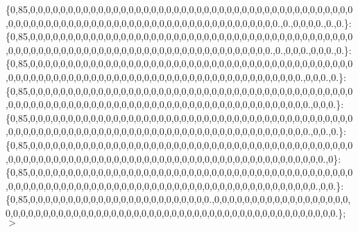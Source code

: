 \{0,85,0,0,0,0,0,0,0,0,0,0,0,0,0,0,0,0,0,0,0,0,0,0,0,0,0,0,0,0,0,0,0,0,0,0,0,0,0,0,0,0,0,0,0,0,0,0,0,0,0,0,0,0,0,0,0,0,0,0,0,0,0,0,0,0,0,0,0,0,0,0,0,0,0,0,0,0,0,0,0.,0.,0,0,0,0.,0.,0.\}\+: \{0,85,0,0,0,0,0,0,0,0,0,0,0,0,0,0,0,0,0,0,0,0,0,0,0,0,0,0,0,0,0,0,0,0,0,0,0,0,0,0,0,0,0,0,0,0,0,0,0,0,0,0,0,0,0,0,0,0,0,0,0,0,0,0,0,0,0,0,0,0,0,0,0,0,0,0,0,0,0,0.,0.,0,0,0.,0,0,0.,0.\}\+: \{0,85,0,0,0,0,0,0,0,0,0,0,0,0,0,0,0,0,0,0,0,0,0,0,0,0,0,0,0,0,0,0,0,0,0,0,0,0,0,0,0,0,0,0,0,0,0,0,0,0,0,0,0,0,0,0,0,0,0,0,0,0,0,0,0,0,0,0,0,0,0,0,0,0,0,0,0,0,0,0,0,0,0,0.,0,0,0.,0.\}\+: \{0,85,0,0,0,0,0,0,0,0,0,0,0,0,0,0,0,0,0,0,0,0,0,0,0,0,0,0,0,0,0,0,0,0,0,0,0,0,0,0,0,0,0,0,0,0,0,0,0,0,0,0,0,0,0,0,0,0,0,0,0,0,0,0,0,0,0,0,0,0,0,0,0,0,0,0,0,0,0,0,0,0,0,0,0.,0,0,0.\}\+: \{0,85,0,0,0,0,0,0,0,0,0,0,0,0,0,0,0,0,0,0,0,0,0,0,0,0,0,0,0,0,0,0,0,0,0,0,0,0,0,0,0,0,0,0,0,0,0,0,0,0,0,0,0,0,0,0,0,0,0,0,0,0,0,0,0,0,0,0,0,0,0,0,0,0,0,0,0,0,0,0,0,0,0,0,0.,0,0.,0.\}\+: \{0,85,0,0,0,0,0,0,0,0,0,0,0,0,0,0,0,0,0,0,0,0,0,0,0,0,0,0,0,0,0,0,0,0,0,0,0,0,0,0,0,0,0,0,0,0,0,0,0,0,0,0,0,0,0,0,0,0,0,0,0,0,0,0,0,0,0,0,0,0,0,0,0,0,0,0,0,0,0,0,0,0,0,0,0,0,0.,0\}\+: \{0,85,0,0,0,0,0,0,0,0,0,0,0,0,0,0,0,0,0,0,0,0,0,0,0,0,0,0,0,0,0,0,0,0,0,0,0,0,0,0,0,0,0,0,0,0,0,0,0,0,0,0,0,0,0,0,0,0,0,0,0,0,0,0,0,0,0,0,0,0,0,0,0,0,0,0,0,0,0,0,0,0,0,0,0,0.,0,0.\}\+: \{0,85,0,0,0,0,0,0,0,0,0,0,0,0,0,0,0,0,0,0,0,0,0,0,0,0.,0,0,0,0,0,0,0,0,0,0,0,0,0,0,0,0,0,0,0,0,0,0,0,0,0,0,0,0,0,0,0,0,0,0,0,0,0,0,0,0,0,0,0,0,0,0,0,0,0,0,0,0,0,0,0,0,0,0,0,0,0,0.\}; $>$ 